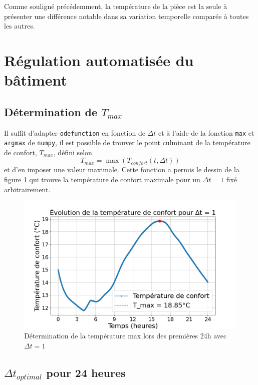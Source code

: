 \documentclass[12pt]{article}
\begin{document}
        Comme souligné précédemment, la température de la pièce est la seule à présenter une différence notable dans sa variation temporelle comparée à toutes les autres.

\section{Régulation automatisée du bâtiment}

    \subsection{Détermination de $T_{max}$}
    
        Il suffit d'adapter \texttt{odefunction} en fonction de $\Delta t$ et à l'aide de la fonction \texttt{max} et \texttt{argmax} de \texttt{numpy}, il est possible de trouver le point culminant de la température de confort, $T_{max}$, défini selon
        \begin{equation}
            T_{max} = \max \left( T_{confort}(t, \Delta t) \right)
        \end{equation}
        et d'en imposer une valeur maximale. Cette fonction a permis le dessin de la figure \ref{fig:24h} qui trouve la température de confort maximale pour un $\Delta t = 1 $ fixé arbitrairement.
        \begin{figure}
            \centering
            \includegraphics[width=0.70\linewidth]{Rapport/figures/T_confort_24h.png}
            \caption{Détermination de la température max lors des premières 24h avec $\Delta t = 1$}
            \label{fig:24h}
        \end{figure}
    
    \subsection{$\Delta t_{optimal}$ pour 24 heures}\label{section:Delta_t_optimal}
\end{document}
